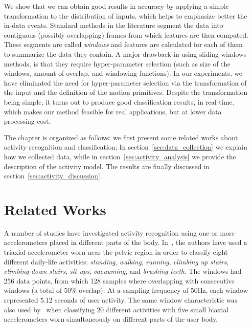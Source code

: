 We show that we can obtain good results in accuracy by applying a simple transformation to the distribution of inputs, which helps to emphasize better the in-data events. Standard methods in the literature segment the data into contiguous (possibly overlapping) frames from which features are then computed. These segments are called \textit{windows} and features are calculated for each of them to summarize the data they contain. A major drawback in using sliding windows methods, is that they require hyper-parameter selection (such as size of the windows, amount of overlap, and windowing functions). In our experiments, we have eliminated the need for hyper-parameter selection via the transformation of the input and the definition of the motion primitives. Despite the transformation being simple, it turns out to produce good classification results, in real-time, which makes our method feasible for real applications, but at lower data processing cost.

The chapter is organized as follows: we first present some related works about activity recognition and classification; In section~\ref{sec:data_collection} we explain how we collected data, while in section~\ref{sec:activity_analysis} we provide the description of the activity model. The results are finally discussed in section~\ref{sec:activity_discussion}.

\section{Related Works}\label{sec:act_related_works}


A number of studies have investigated activity recognition using one or more accelerometers placed in different parts of the body. In~\cite{ravi_activity_2005}, the authors have used a triaxial accelerometer worn near the pelvic region in order to classify eight different daily-life activities: \textit{standing}, \textit{walking}, \textit{running}, \textit{climbing up stairs}, \textit{climbing down stairs}, \textit{sit-ups}, \textit{vacuuming}, and \textit{brushing teeth}. The windows had 256 data points, from which 128 samples where overlapping with consecutive windows (a total of 50\% overlap). At a sampling frequency of 50Hz, each window represented 5.12 seconds of user activity. The same window characteristic was also used by~\cite{bao_activity_2004} when classifying 20 different activities with five small biaxial accelerometers worn simultaneously on different parts of the user body.

